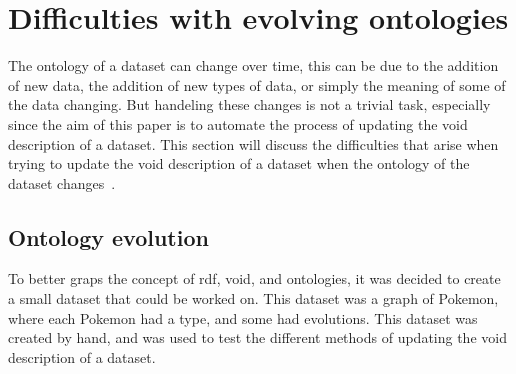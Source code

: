 \section{Difficulties with evolving ontologies}\label{sec:difficulties-with-evolving-ontologies}

The ontology of a dataset can change over time, this can be due to the addition of new data, the addition of new types of data, or simply the meaning of some of the data changing. But handeling these changes is not a trivial task, especially since the aim of this paper is to automate the process of updating the \gls{void} description of a dataset. This section will discuss the difficulties that arise when trying to update the \gls{void} description of a dataset when the ontology of the dataset changes~\cite{evolving-ontology-evolution}.

\subsection{Ontology evolution}
To better graps the concept of \gls{rdf}, \gls{void}, and ontologies, it was decided to create a small dataset that could be worked on. This dataset was a graph of Pokemon, where each Pokemon had a type, and some had evolutions. This dataset was created by hand, and was used to test the different methods of updating the \gls{void} description of a dataset.






